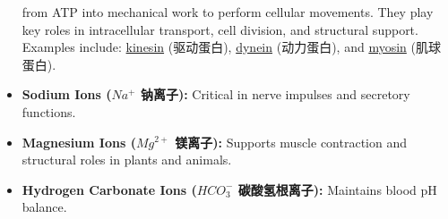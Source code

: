 \begin{itemize}
{    from ATP into mechanical work to perform cellular movements. They play key roles in intracellular transport, cell division,
    and structural support. Examples include: \underline{kinesin} (驱动蛋白), \underline{dynein} (动力蛋白), and \underline{myosin}
    (肌球蛋白).}
    \item \textbf{Sodium Ions ($Na^+$ 钠离子):} Critical in nerve impulses and secretory functions.
    \item \textbf{Magnesium Ions ($Mg^{2+}$ 镁离子):} Supports muscle contraction and structural roles in plants and animals.
    \item \textbf{Hydrogen Carbonate Ions ($HCO_3^-$ 碳酸氢根离子):} Maintains blood pH balance.
\end{itemize}
